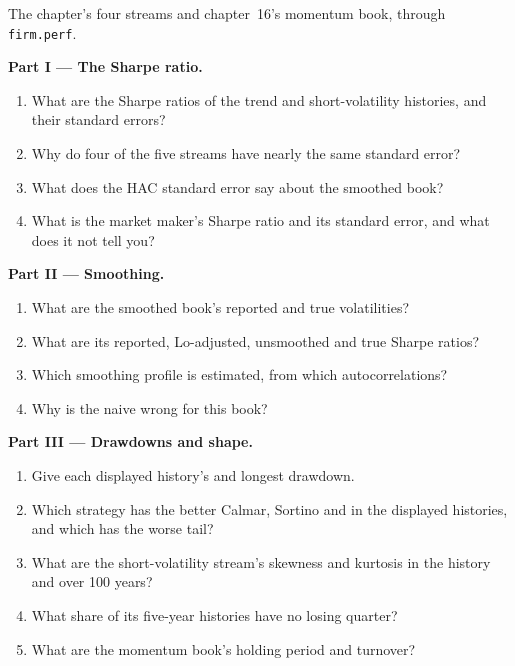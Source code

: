 \begin{problem}\label{pb:rs:performance-measurement:1}
The chapter's four streams and chapter~16's momentum book, through \texttt{firm.perf}.

\medskip\noindent\textbf{Part I --- The Sharpe ratio.}
\begin{enumerate}
\item What are the Sharpe ratios of the trend and short-volatility histories, and their standard errors?
\item Why do four of the five streams have nearly the same standard error?
\item What does the HAC standard error say about the smoothed book?
\item What is the market maker's Sharpe ratio and its standard error, and what does it not tell you?
\end{enumerate}

\medskip\noindent\textbf{Part II --- Smoothing.}
\begin{enumerate}[resume]
\item What are the smoothed book's reported and true volatilities?
\item What are its reported, Lo-adjusted, unsmoothed and true Sharpe ratios?
\item Which smoothing profile is estimated, from which autocorrelations?
\item Why is the naive  wrong for this book?
\end{enumerate}

\medskip\noindent\textbf{Part III --- Drawdowns and shape.}
\begin{enumerate}[resume]
\item Give each displayed history's  and longest drawdown.
\item Which strategy has the better Calmar, Sortino and  in the displayed histories, and which has the worse tail?
\item What are the short-volatility stream's skewness and kurtosis in the history and over 100 years?
\item What share of its five-year histories have no losing quarter?
\item What are the momentum book's holding period and turnover?
\end{enumerate}


\end{problem}
